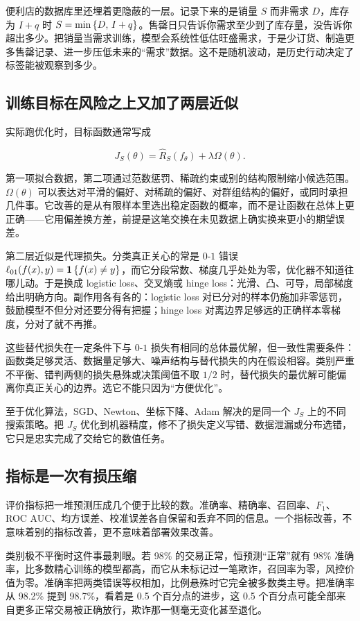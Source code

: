 便利店的数据库里还埋着更隐蔽的一层。记录下来的是销量 \(S\) 而非需求 \(D\)，库存为 \(I+q\) 时 \(S=\min\left\{D,\,I+q\right\}\)。售罄日只告诉你需求至少到了库存量，没告诉你超出多少。把销量当需求训练，模型会系统性低估旺盛需求，于是少订货、制造更多售罄记录、进一步压低未来的``需求''数据。这不是随机波动，是历史行动决定了标签能被观察到多少。

\subsection{训练目标在风险之上又加了两层近似}

实际跑优化时，目标函数通常写成

\[
J_S(\theta)=\widehat R_S(f_\theta)+\lambda\Omega(\theta).
\]

第一项拟合数据，第二项通过范数惩罚、稀疏约束或别的结构限制缩小候选范围。\(\Omega(\theta)\) 可以表达对平滑的偏好、对稀疏的偏好、对群组结构的偏好，或同时承担几件事。它改善的是从有限样本里选出稳定函数的概率，而不是让函数在总体上更正确——它用偏差换方差，前提是这笔交换在未见数据上确实换来更小的期望误差。

第二层近似是代理损失。分类真正关心的常是 \(0\)-\(1\) 错误 \(\ell_{01}(f(x),y)=\mathbf{1}\left\{f(x)\ne y\right\}\)，而它分段常数、梯度几乎处处为零，优化器不知道往哪儿动。于是换成 logistic loss、交叉熵或 hinge loss：光滑、凸、可导，局部梯度给出明确方向。副作用各有各的：logistic loss 对已分对的样本仍施加非零惩罚，鼓励模型不但分对还要分得有把握；hinge loss 对离边界足够远的正确样本零梯度，分对了就不再推。

这些替代损失在一定条件下与 \(0\)-\(1\) 损失有相同的总体最优解，但一致性需要条件：函数类足够灵活、数据量足够大、噪声结构与替代损失的内在假设相容。类别严重不平衡、错判两侧的损失悬殊或决策阈值不取 \(1/2\) 时，替代损失的最优解可能偏离你真正关心的边界。选它不能只因为``方便优化''。

至于优化算法，SGD、Newton、坐标下降、Adam 解决的是同一个 \(J_S\) 上的不同搜索策略。把 \(J_S\) 优化到机器精度，修不了损失定义写错、数据泄漏或分布选错，它只是忠实完成了交给它的数值任务。

\subsection{指标是一次有损压缩}

评价指标把一堆预测压成几个便于比较的数。准确率、精确率、召回率、\(F_1\)、ROC AUC、均方误差、校准误差各自保留和丢弃不同的信息。一个指标改善，不意味着别的指标改善，更不意味着部署效果改善。

类别极不平衡时这件事最刺眼。若 98\% 的交易正常，恒预测``正常''就有 98\% 准确率，比多数精心训练的模型都高，而它从未标记过一笔欺诈，召回率为零，风控价值为零。准确率把两类错误等权相加，比例悬殊时它完全被多数类主导。把准确率从 98.2\% 提到 98.7\%，看着是 0.5 个百分点的进步，这 0.5 个百分点可能全部来自更多正常交易被正确放行，欺诈那一侧毫无变化甚至退化。

